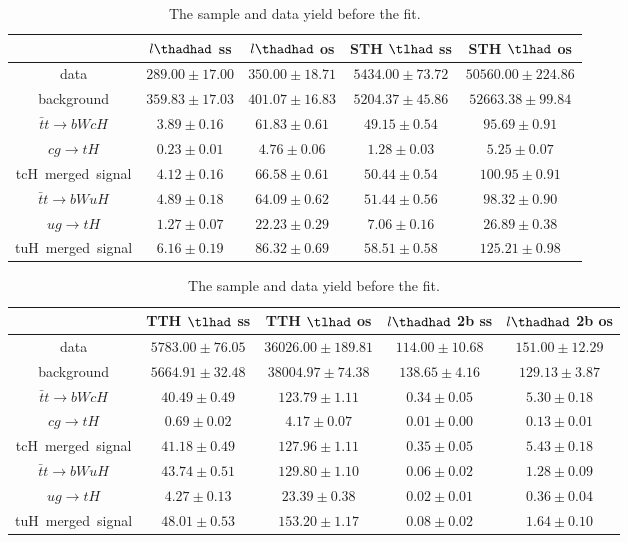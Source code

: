 \begin{table}
\footnotesize
\caption{The sample and data yield before the fit.}
\centering
\begin{tabular}{|c|c|c|c|c|} \hline
 & $l\thadhad$ ss & $l\thadhad$ os & STH $\tlhad$ ss & STH $\tlhad$ os\\\hline
data & $289.00\pm17.00$ & $350.00\pm18.71$ & $5434.00\pm73.72$ & $50560.00\pm224.86$\\\hline
background & $359.83\pm17.03$ & $401.07\pm16.83$ & $5204.37\pm45.86$ & $52663.38\pm99.84$\\\hline
$\bar{t}t\to bWcH$ & $3.89\pm0.16$ & $61.83\pm0.61$ & $49.15\pm0.54$ & $95.69\pm0.91$\\\hline
$cg\to tH$ & $0.23\pm0.01$ & $4.76\pm0.06$ & $1.28\pm0.03$ & $5.25\pm0.07$\\\hline
tcH~merged~signal & $4.12\pm0.16$ & $66.58\pm0.61$ & $50.44\pm0.54$ & $100.95\pm0.91$\\\hline
$\bar{t}t\to bWuH$ & $4.89\pm0.18$ & $64.09\pm0.62$ & $51.44\pm0.56$ & $98.32\pm0.90$\\\hline
$ug\to tH$ & $1.27\pm0.07$ & $22.23\pm0.29$ & $7.06\pm0.16$ & $26.89\pm0.38$\\\hline
tuH~merged~signal & $6.16\pm0.19$ & $86.32\pm0.69$ & $58.51\pm0.58$ & $125.21\pm0.98$\\\hline
\end{tabular}
\begin{tabular}{|c|c|c|c|c|} \hline
 & TTH $\tlhad$ ss & TTH $\tlhad$ os & $l\thadhad$ 2b ss & $l\thadhad$ 2b os\\\hline
data & $5783.00\pm76.05$ & $36026.00\pm189.81$ & $114.00\pm10.68$ & $151.00\pm12.29$\\\hline
background & $5664.91\pm32.48$ & $38004.97\pm74.38$ & $138.65\pm4.16$ & $129.13\pm3.87$\\\hline
$\bar{t}t\to bWcH$ & $40.49\pm0.49$ & $123.79\pm1.11$ & $0.34\pm0.05$ & $5.30\pm0.18$\\\hline
$cg\to tH$ & $0.69\pm0.02$ & $4.17\pm0.07$ & $0.01\pm0.00$ & $0.13\pm0.01$\\\hline
tcH~merged~signal & $41.18\pm0.49$ & $127.96\pm1.11$ & $0.35\pm0.05$ & $5.43\pm0.18$\\\hline
$\bar{t}t\to bWuH$ & $43.74\pm0.51$ & $129.80\pm1.10$ & $0.06\pm0.02$ & $1.28\pm0.09$\\\hline
$ug\to tH$ & $4.27\pm0.13$ & $23.39\pm0.38$ & $0.02\pm0.01$ & $0.36\pm0.04$\\\hline
tuH~merged~signal & $48.01\pm0.53$ & $153.20\pm1.17$ & $0.08\pm0.02$ & $1.64\pm0.10$\\\hline

\end{tabular}
\end{table}
